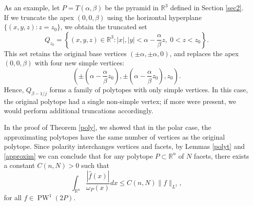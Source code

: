 \documentclass[footinclude=true]{amsart}
\theoremstyle{plain}
\DeclareMathOperator{\PW}{PW}
\begin{document}
    As an example, let $P = T(\alpha, \beta)$ be the pyramid in $\mathbb{R}^3$ defined in Section \ref{sec2}. If we truncate the apex $(0,0,\beta)$ using the horizontal hyperplane $\{(x, y, z) : z = z_0\}$, we obtain the truncated set
    $$
    Q_{z_0} = \left\{ (x, y, z) \in \mathbb{R}^3 : |x|, |y| < \alpha - \frac{\alpha}{\beta}z, \; 0 < z < z_0 \right\}.
    $$
    This set retains the original base vertices $(\pm\alpha, \pm\alpha, 0)$, and replaces the apex $(0, 0, \beta)$ with four new simple vertices:
    $$
    \left(\pm\left(\alpha - \frac{\alpha}{\beta}z_0\right), \pm\left(\alpha - \frac{\alpha}{\beta}z_0\right), z_0\right).
    $$
    Hence, $Q_{\beta-1/j}$ forms a family of polytopes with only simple vertices. In this case, the original polytope had a single non-simple vertex; if more were present, we would perform additional truncations accordingly.
    \par In the proof of Theorem \ref{poly}, we showed that in the polar case, the approximating polytopes have the same number of vertices as the original polytope. Since polarity interchanges vertices and facets, by Lemmas \ref{polyt} and \ref{approxim} we can conclude that for any polytope $P\subset\mathbb{R}^{n}$ of $N$ facets, there exists a constant $C(n,N)>0$ such that 
    $$\int_{\mathbb{R}^n}\dfrac{|\widehat{f}(x)|}{\omega_{P}(x)}dx\leq C(n,N)\|f\|_{L^1},$$ for all $f\in \PW^1(2P)$.
	
\end{document}
